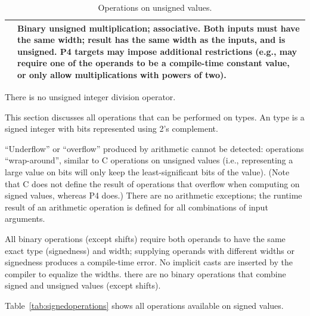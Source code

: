 \documentclass[12pt]{article}
\begin{document}
\begin{table}[!h]
\begin{tabular}{|lp{\descwidth}|}
    \code{*} & Binary unsigned multiplication; associative.  Both
    inputs must have the same width; result has the same width as
    the inputs, and is unsigned.  P4 targets may impose additional
    restrictions (e.g., may require one of the operands to be a
    compile-time constant value, or only allow multiplications with
    powers of two). \\
    
    \hline
  \end{tabular}
  \caption{Operations on unsigned values.\label{tab:unsignedoperations}}
\end{table}

There is no unsigned integer division operator.


This section discusses all operations that can be performed on
\Int{\W} types.  An \Int{\W} type is a signed integer with \W{} bits
represented using 2's complement.

``Underflow'' or ``overflow'' produced by arithmetic cannot be
detected: operations ``wrap-around'', similar to C operations on
unsigned values (i.e., representing a large value on \W{} bits will
only keep the least-significant \W{} bits of the value).  (Note that C
does not define the result of operations that overflow when computing
on signed values, whereas P4 does.)  There are no arithmetic
exceptions; the runtime result of an arithmetic operation is defined
for all combinations of input arguments.

All binary operations (except shifts) require both operands to have
the same exact type (signedness) and width; supplying operands with
different widths or signedness produces a compile-time error.  No
implicit casts are inserted by the compiler to equalize the widths.
there are no binary operations that combine signed and unsigned values
(except shifts).

Table~\ref{tab:signedoperations} shows all operations available on
signed values.
\end{document}
